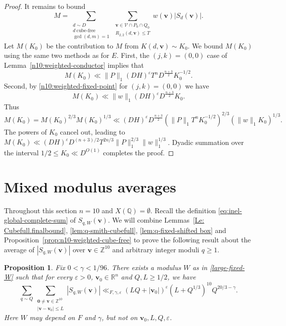 \documentclass[a4paper,11pt, twoside,reqno]{amsart}
\theoremstyle{plain}
\newtheorem{prop}[thm]{Proposition}
\theoremstyle{definition}
\theoremstyle{remark}
\newcommand{\bfv}{\bm{v}}
\newcommand{\ZZ}{\mathbb{Z}}
\newcommand{\RR}{\mathbb{R}}
\newcommand{\QQ}{\mathbb{Q}}
\newcommand{\ve}{\varepsilon}
\renewcommand{\le}{\leqslant}
\renewcommand{\leq}{\leqslant}
\renewcommand{\ge}{\geqslant}
\numberwithin{equation}{section}
\begin{document}
\begin{proof}
It remains to bound
\[
M = \sum_{\substack{
d\sim D\\
d\ \text{cube-free}\\
\gcd(d,m)=1}}
\sum_{\substack{
\bfv\in\mathcal V\cap P_0\cap Q_0 \\ R_{2,2}(d,\bfv)\leq T}}w(\bfv)|S_{d}(\bfv)|.
\]
Let $M(K_0)$ be the contribution to $M$ from $K(d,\bfv) \sim K_0$.
We bound $M(K_0)$ using the same two methods as for $E$.
First, the $(j,k)=(0,0)$ case of Lemma~\ref{n10:weighted-conductor} implies that
\begin{equation*}
M(K_0) \ll \|P\|_{1}
(DH)^\ve T^n D^{\frac{n+3}{2}} K_0^{-1/2}.
\end{equation*}
Second, by \eqref{n10:weighted-fixed-point} for $(j,k)=(0,0)$ we have
\begin{equation*}
M(K_0) \ll
\|w\|_{1} (DH)^\ve D^{\frac{n+3}{2}} K_0.
\end{equation*}
Thus
\begin{equation*}
M(K_0)
= M(K_0)^{2/3} M(K_0)^{1/3}
\ll (DH)^\ve D^{\frac{n+3}{2}}
\left(\|P\|_{1} T^n K_0^{-1/2}\right)^{2/3}
\left(\|w\|_{1} K_0\right)^{1/3}.
\end{equation*}
The powers of $K_0$ cancel out,
leading to $M(K_0) \ll (DH)^\ve D^{(n+3)/2}T^{2n/3}\|P\|_1^{2/3}\|w\|_1^{1/3}$.
Dyadic summation over the interval $1/2 \le K_0 \ll D^{O(1)}$ completes the proof.
\end{proof}




\section{Mixed modulus averages}
\label{sec:n10-mixed-moduli}

Throughout this section $n=10$ and $X(\QQ)=\emptyset$.
Recall the definition \eqref{eq:inel-global-complete-sum} of 
$S_{q,W}(\bfv)$. 
We will combine Lemmas~\ref{Le: Cubefull.finalbound},
\ref{lem:q-smith-cubefull},
\ref{lem:q-fixed-shifted box}
and Proposition~\ref{prop:n10-weighted-cube-free} to prove the following result about the average of 
$|S_{q,W}(\bfv)|$ over $\bfv\in \ZZ^{10}$ and  arbitrary integer moduli $q\ge 1$.

\begin{prop}\label{prop:n10-clean-shifted}
Fix $0<\gamma<1/96$.
There exists a modulus $W$ as in \eqref{large-fixed-W} such that
for every $\varepsilon>0$, $\bfv_0\in \RR^n$ and $Q,L\ge 1/2$, we have
\begin{equation}\label{eq:n10-clean-shifted}
\sum_{q\sim Q}
\sum_{\substack{\bm0\ne\bfv\in\ZZ^{10}\\
|\bfv-\bfv_0|\le L}}
|S_{q,W}(\bfv)|
\ll_{F,\gamma,\ve}
(LQ+|\bfv_0|)^\ve (L+Q^{1/3})^{10}Q^{20/3-\gamma}.
\end{equation}
Here $W$ may depend on $F$ and $\gamma$, but not on $\bfv_0,L,Q,\ve$.
\end{prop}
\end{document}
